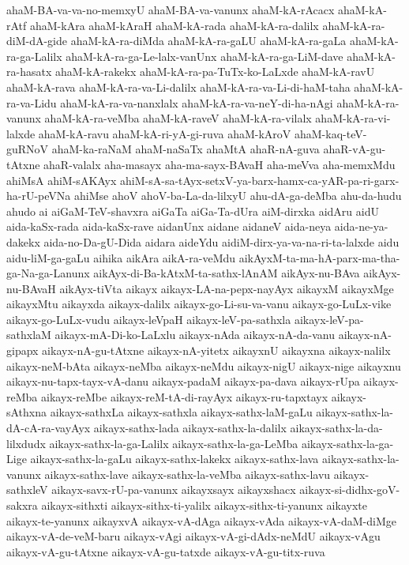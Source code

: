 {ahaM-BA-va-va-no-memxyU
ahaM-BA-va-vanunx
ahaM-kA-rAcacx
ahaM-kA-rAtf
ahaM-kAra
ahaM-kAraH
ahaM-kA-rada
ahaM-kA-ra-dalilx
ahaM-kA-ra-diM-dA-gide
ahaM-kA-ra-diMda
ahaM-kA-ra-gaLU
ahaM-kA-ra-gaLa
ahaM-kA-ra-ga-Lalilx
ahaM-kA-ra-ga-Le-lalx-vanUnx
ahaM-kA-ra-ga-LiM-dave
ahaM-kA-ra-hasatx
ahaM-kA-rakekx
ahaM-kA-ra-pa-TuTx-ko-LaLxde
ahaM-kA-ravU
ahaM-kA-rava
ahaM-kA-ra-va-Li-dalilx
ahaM-kA-ra-va-Li-di-haM-taha
ahaM-kA-ra-va-Lidu
ahaM-kA-ra-va-nanxlalx
ahaM-kA-ra-va-neY-di-ha-nAgi
ahaM-kA-ra-vanunx
ahaM-kA-ra-veMba
ahaM-kA-raveV
ahaM-kA-ra-vilalx
ahaM-kA-ra-vi-lalxde
ahaM-kA-ravu
ahaM-kA-ri-yA-gi-ruva
ahaM-kAroV
ahaM-kaq-teV-guRNoV
ahaM-ka-raNaM
ahaM-naSaTx
ahaMtA
ahaR-nA-guva
ahaR-vA-gu-tAtxne
ahaR-valalx
aha-masayx
aha-ma-sayx-BAvaH
aha-meVva
aha-memxMdu
ahiMsA
ahiM-sAKAyx
ahiM-sA-sa-tAyx-setxV-ya-barx-hamx-ca-yAR-pa-ri-garx-ha-rU-peVNa
ahiMse
ahoV
ahoV-ba-La-da-lilxyU
ahu-dA-ga-deMba
ahu-da-hudu
ahudo
ai
aiGaM-TeV-shavxra
aiGaTa
aiGa-Ta-dUra
aiM-dirxka
aidAru
aidU
aida-kaSx-rada
aida-kaSx-rave
aidanUnx
aidane
aidaneV
aida-neya
aida-ne-ya-dakekx
aida-no-Da-gU-Dida
aidara
aideYdu
aidiM-dirx-ya-va-na-ri-ta-lalxde
aidu
aidu-liM-ga-gaLu
aihika
aikAra
aikA-ra-veMdu
aikAyxM-ta-ma-hA-parx-ma-tha-ga-Na-ga-Lanunx
aikAyx-di-Ba-kAtxM-ta-sathx-lAnAM
aikAyx-nu-BAva
aikAyx-nu-BAvaH
aikAyx-tiVta
aikayx
aikayx-LA-na-pepx-nayAyx
aikayxM
aikayxMge
aikayxMtu
aikayxda
aikayx-dalilx
aikayx-go-Li-su-va-vanu
aikayx-go-LuLx-vike
aikayx-go-LuLx-vudu
aikayx-leVpaH
aikayx-leV-pa-sathxla
aikayx-leV-pa-sathxlaM
aikayx-mA-Di-ko-LaLxlu
aikayx-nAda
aikayx-nA-da-vanu
aikayx-nA-gipapx
aikayx-nA-gu-tAtxne
aikayx-nA-yitetx
aikayxnU
aikayxna
aikayx-nalilx
aikayx-neM-bAta
aikayx-neMba
aikayx-neMdu
aikayx-nigU
aikayx-nige
aikayxnu
aikayx-nu-tapx-tayx-vA-danu
aikayx-padaM
aikayx-pa-dava
aikayx-rUpa
aikayx-reMba
aikayx-reMbe
aikayx-reM-tA-di-rayAyx
aikayx-ru-tapxtayx
aikayx-sAthxna
aikayx-sathxLa
aikayx-sathxla
aikayx-sathx-laM-gaLu
aikayx-sathx-la-dA-cA-ra-vayAyx
aikayx-sathx-lada
aikayx-sathx-la-dalilx
aikayx-sathx-la-da-lilxdudx
aikayx-sathx-la-ga-Lalilx
aikayx-sathx-la-ga-LeMba
aikayx-sathx-la-ga-Lige
aikayx-sathx-la-gaLu
aikayx-sathx-lakekx
aikayx-sathx-lava
aikayx-sathx-la-vanunx
aikayx-sathx-lave
aikayx-sathx-la-veMba
aikayx-sathx-lavu
aikayx-sathxleV
aikayx-savx-rU-pa-vanunx
aikayxsayx
aikayxshacx
aikayx-si-didhx-goV-sakxra
aikayx-sithxti
aikayx-sithx-ti-yalilx
aikayx-sithx-ti-yanunx
aikayxte
aikayx-te-yanunx
aikayxvA
aikayx-vA-dAga
aikayx-vAda
aikayx-vA-daM-diMge
aikayx-vA-de-veM-baru
aikayx-vAgi
aikayx-vA-gi-dAdx-neMdU
aikayx-vAgu
aikayx-vA-gu-tAtxne
aikayx-vA-gu-tatxde
aikayx-vA-gu-titx-ruva
}
